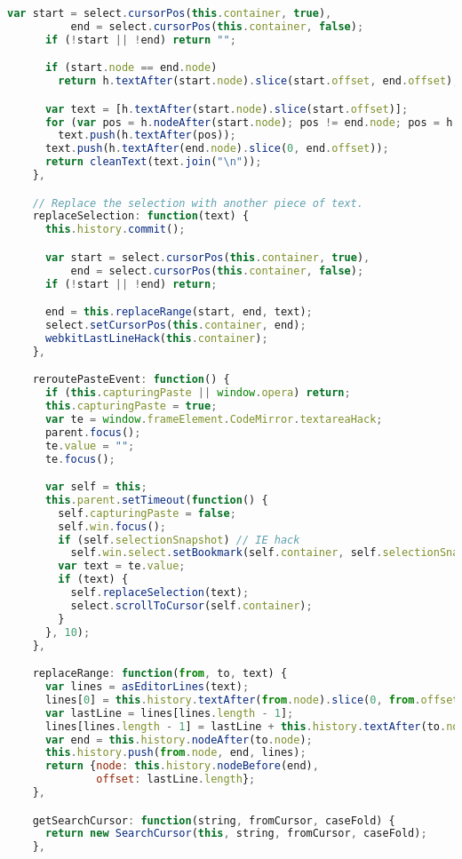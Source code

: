 \begin{lstlisting}[language=Javascript]
      var start = select.cursorPos(this.container, true),
          end = select.cursorPos(this.container, false);
      if (!start || !end) return "";

      if (start.node == end.node)
        return h.textAfter(start.node).slice(start.offset, end.offset);

      var text = [h.textAfter(start.node).slice(start.offset)];
      for (var pos = h.nodeAfter(start.node); pos != end.node; pos = h.nodeAfter(pos))
        text.push(h.textAfter(pos));
      text.push(h.textAfter(end.node).slice(0, end.offset));
      return cleanText(text.join("\n"));
    },

    // Replace the selection with another piece of text.
    replaceSelection: function(text) {
      this.history.commit();

      var start = select.cursorPos(this.container, true),
          end = select.cursorPos(this.container, false);
      if (!start || !end) return;

      end = this.replaceRange(start, end, text);
      select.setCursorPos(this.container, end);
      webkitLastLineHack(this.container);
    },

    reroutePasteEvent: function() {
      if (this.capturingPaste || window.opera) return;
      this.capturingPaste = true;
      var te = window.frameElement.CodeMirror.textareaHack;
      parent.focus();
      te.value = "";
      te.focus();

      var self = this;
      this.parent.setTimeout(function() {
        self.capturingPaste = false;
        self.win.focus();
        if (self.selectionSnapshot) // IE hack
          self.win.select.setBookmark(self.container, self.selectionSnapshot);
        var text = te.value;
        if (text) {
          self.replaceSelection(text);
          select.scrollToCursor(self.container);
        }
      }, 10);
    },

    replaceRange: function(from, to, text) {
      var lines = asEditorLines(text);
      lines[0] = this.history.textAfter(from.node).slice(0, from.offset) + lines[0];
      var lastLine = lines[lines.length - 1];
      lines[lines.length - 1] = lastLine + this.history.textAfter(to.node).slice(to.offset);
      var end = this.history.nodeAfter(to.node);
      this.history.push(from.node, end, lines);
      return {node: this.history.nodeBefore(end),
              offset: lastLine.length};
    },

    getSearchCursor: function(string, fromCursor, caseFold) {
      return new SearchCursor(this, string, fromCursor, caseFold);
    },


\end{lstlisting}
